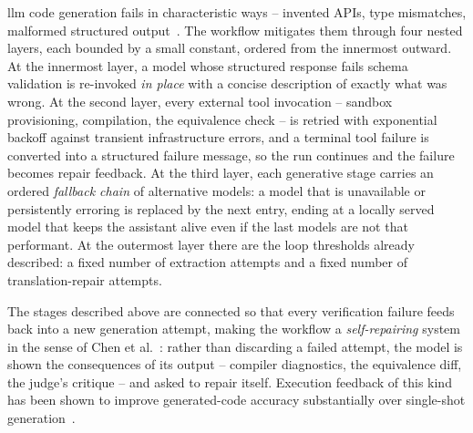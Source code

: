 \Acrshort{llm} code generation fails in characteristic ways -- invented APIs, type mismatches, malformed structured output~\cite{spracklenPackageHallucinations2025}. The workflow mitigates them through four nested layers, each bounded by a small constant, ordered from the innermost outward. At the innermost layer, a model whose structured response fails schema validation is re-invoked \emph{in place} with a concise description of exactly what was wrong. At the second layer, every external tool invocation -- sandbox provisioning, compilation, the equivalence check -- is retried with exponential backoff against transient infrastructure errors, and a terminal tool failure is converted into a structured failure message, so the run continues and the failure becomes repair feedback. At the third layer, each generative stage carries an ordered \emph{fallback chain} of alternative models: a model that is unavailable or persistently erroring is replaced by the next entry, ending at a locally served model that keeps the assistant alive even if the last models are not that performant. At the outermost layer there are the loop thresholds already described: a fixed number of extraction attempts and a fixed number of translation-repair attempts.

The stages described above are connected so that every verification failure feeds back into a new generation attempt, making the workflow a \emph{self-repairing} system in the sense of Chen et al.~\cite{chenSelfDebug2023}: rather than discarding a failed attempt, the model is shown the consequences of its output -- compiler diagnostics, the equivalence diff, the judge's critique -- and asked to repair itself. Execution feedback of this kind has been shown to improve generated-code accuracy substantially over single-shot generation~\cite{chenSelfDebug2023}.
